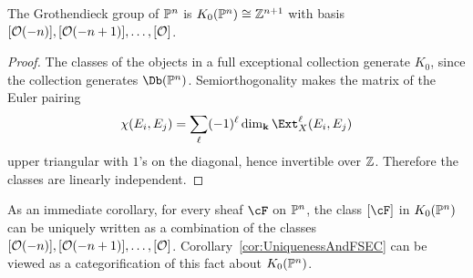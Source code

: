\documentclass{amsart}
\begin{document}
\begin{cor}\label{cor:K0PPn}
  The Grothendieck group of $\mathbb P^n$ is $K_0(\mathbb P^n) \cong \mathbb Z^{n+1}$ with basis $[{\mathcal O}(-n)],[{\mathcal O}(-n+1)],\dots,[{\mathcal O}]$.
\end{cor}
\begin{proof}
  The classes of the objects in a full exceptional collection generate $K_0$, since the collection generates $\Db(\PP^n)$. Semiorthogonality makes the matrix of the Euler pairing
  \[ \chi(E_i,E_j) = \sum_\ell (-1)^\ell \dim_\kk\Ext_X^\ell(E_i,E_j) \]
  upper triangular with $1$'s on the diagonal, hence invertible over $\mathbb Z$. Therefore the classes are linearly independent.
\end{proof}

\begin{remark}
    As an immediate corollary, for every sheaf $\cF$ on $\mathbb P^n$, the class $[\cF]$ in $K_0(\mathbb P^n)$ can be uniquely written as a combination of the classes $[{\mathcal O}(-n)], [{\mathcal O}(-n+1)], \dots, [{\mathcal O}]$.  Corollary~\ref{cor:UniquenessAndFSEC} can be viewed as a categorification of this fact about $K_0(\mathbb P^n)$.
\end{remark}
\end{document}
